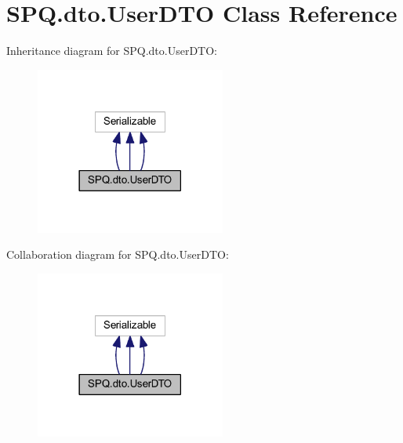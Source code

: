 \hypertarget{class_s_p_q_1_1dto_1_1_user_d_t_o}{}\section{S\+P\+Q.\+dto.\+User\+D\+TO Class Reference}
\label{class_s_p_q_1_1dto_1_1_user_d_t_o}


Inheritance diagram for S\+P\+Q.\+dto.\+User\+D\+TO\+:
\nopagebreak
\begin{figure}[H]
\begin{center}
\leavevmode
\includegraphics[width=177pt]{class_s_p_q_1_1dto_1_1_user_d_t_o__inherit__graph}
\end{center}
\end{figure}


Collaboration diagram for S\+P\+Q.\+dto.\+User\+D\+TO\+:
\nopagebreak
\begin{figure}[H]
\begin{center}
\leavevmode
\includegraphics[width=177pt]{class_s_p_q_1_1dto_1_1_user_d_t_o__coll__graph}
\end{center}
\end{figure}
